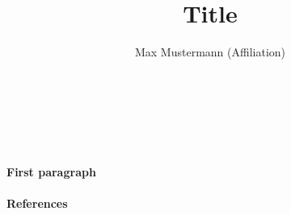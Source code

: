 \documentclass[
12pt,
a4paper,
]{article}
\author{Max Mustermann (Affiliation)}
\title{Title }
\makeatletter
\renewcommand\maketitle{

  ~\vspace{-1.1cm}

  {\raggedright
    \renewcommand{\baselinestretch}{1.2}\selectfont
  {\bfseries\large\@title}\\[2ex]
  {\large\@author}

  }
}
\makeatother
\begin{document}
\maketitle

\paragraph{First paragraph}

\paragraph{References}
{\tiny
\printbibliography[heading=none]
}
\end{document}
